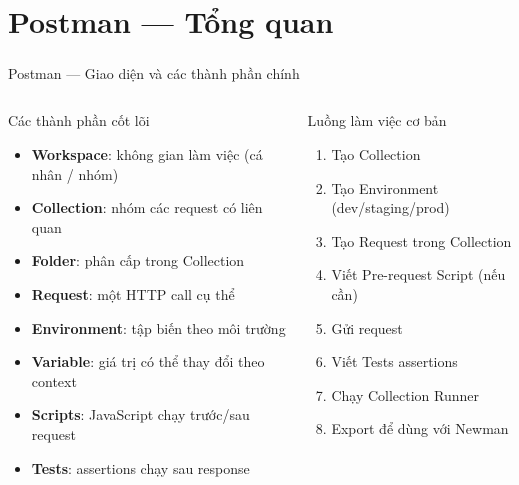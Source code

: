 \documentclass[aspectratio=169,10pt]{beamer}
\newcommand{\sref}[1]{\textsuperscript{\scriptsize\cite{#1}}}
\begin{document}
\section{Postman --- Tổng quan}

\begin{frame}{Postman --- Giao diện và các thành phần chính\sref{postman}}
  \begin{columns}
    \begin{block}{Các thành phần cốt lõi}
      \begin{itemize}
        \item \textbf{Workspace}: không gian làm việc (cá nhân / nhóm)
        \item \textbf{Collection}: nhóm các request có liên quan
        \item \textbf{Folder}: phân cấp trong Collection
        \item \textbf{Request}: một HTTP call cụ thể
        \item \textbf{Environment}: tập biến theo môi trường
        \item \textbf{Variable}: giá trị có thể thay đổi theo context
        \item \textbf{Scripts}: JavaScript chạy trước/sau request
        \item \textbf{Tests}: assertions chạy sau response
      \end{itemize}
    \end{block}

    \begin{block}{Luồng làm việc cơ bản}
      \begin{enumerate}
        \item Tạo Collection
        \item Tạo Environment (dev/staging/prod)
        \item Tạo Request trong Collection
        \item Viết Pre-request Script (nếu cần)
        \item Gửi request
        \item Viết Tests assertions
        \item Chạy Collection Runner
        \item Export để dùng với Newman
      \end{enumerate}
    \end{block}
  \end{columns}
\end{frame}
\end{document}
